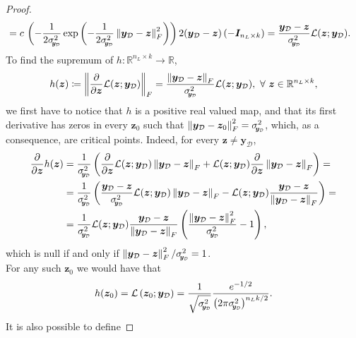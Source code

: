 \documentclass[a4paper, 11pt, reqno]{amsart}
\theoremstyle{plain}
\theoremstyle{remark}
\theoremstyle{definition}
\newcommand{\real}{\mathbb{R}}
\newcommand{\norm}[1]{\left\lVert#1\right\rVert}
\renewcommand{\exp}[1]{\operatorname{exp}\left(#1\right)}
\let\oldforall\forall
\renewcommand{\forall}{\oldforall\,}
\newcommand{\sigmay}{\sigma_{\scalebox{0.65}{$\kern-3pt\bm{y}_{\mathcal{D}}$}}}%
\begin{document}
\begin{proof}
\begin{equation*}
\begin{aligned}
			& = c \, \left(- \frac{1}{2 \sigmay^2} \exp{-\frac{1}{2\sigmay^2} \norm{\bm{y}_{\mathcal{D}} - \bm{z}}_F^2}\right) 2 (\bm{y}_{\mathcal{D}} - \bm{z}) \left(- \bm{I}_{n_L \times k}\right) = \frac{\bm{y}_{\mathcal{D}} - \bm{z}}{\sigmay^2} \mathcal{L}(\bm{z}; \bm{y}_{\mathcal{D}}).
		\end{aligned}
	\end{equation*}
	To find the supremum of $h: \real^{n_L \times k} \to \real$, 
	\begin{equation*}
		h(\bm{z}) \coloneqq \norm{\frac{\partial}{\partial \bm{z}} \mathcal{L}(\bm{z}; \bm{y}_{\mathcal{D}})}_F = \frac{\norm{\bm{y}_{\mathcal{D}} - \bm{z}}_F}{\sigmay^2} \mathcal{L}(\bm{z}; \bm{y}_{\mathcal{D}}), \ \forall \bm{z} \in \real^{n_L \times k},
	\end{equation*}
	we first have to notice that $h$ is a positive real valued map, and that its first derivative has zeros in every $\bm{z}_0$ such that $\norm{\bm{y}_{\mathcal{D}} - \bm{z}_0}_F^2 = \sigmay^2$, which, as a consequence, are critical points. Indeed, for every $\bm{z} \neq \bm{y}_{\mathcal{D}}$,
	\begin{align*}
		\frac{\partial}{\partial \bm{z}} h(\bm{z}) & = \frac{1}{\sigmay^2} \left(\frac{\partial}{\partial \bm{z}} \mathcal{L}(\bm{z}; \bm{y}_{\mathcal{D}}) \norm{\bm{y}_{\mathcal{D}} - \bm{z}}_F + \mathcal{L}(\bm{z}; \bm{y}_{\mathcal{D}}) \frac{\partial}{\partial \bm{z}} \norm{\bm{y}_{\mathcal{D}} - \bm{z}}_F\right) = \\
		& = \frac{1}{\sigmay^2} \left(\frac{\bm{y}_{\mathcal{D}} - \bm{z}}{\sigmay^2} \mathcal{L}(\bm{z}; \bm{y}_{\mathcal{D}}) \norm{\bm{y}_{\mathcal{D}} - \bm{z}}_F - \mathcal{L}(\bm{z}; \bm{y}_{\mathcal{D}}) \frac{\bm{y}_{\mathcal{D}} - \bm{z}}{\norm{\bm{y}_{\mathcal{D}} - \bm{z}}_F}\right) = \\
		& = \frac{1}{\sigmay^2} \mathcal{L}(\bm{z}; \bm{y}_{\mathcal{D}}) \frac{\bm{y}_{\mathcal{D}} - \bm{z}}{\norm{\bm{y}_{\mathcal{D}} - \bm{z}}_F} \left(\frac{\norm{\bm{y}_{\mathcal{D}} - \bm{z}}_F^2}{\sigmay^2} - 1\right),
	\end{align*}
	which is null if and only if $\norm{\bm{y}_{\mathcal{D}} - \bm{z}}_F^2 / \sigmay^2 = 1$. \\
	For any such $\bm{z}_0$ we would have that
	\begin{equation*}
		h(\bm{z}_0) = \mathcal{L}\left(\bm{z}_0; \bm{y}_{\mathcal{D}}\right) = \frac{1}{\sqrt{\sigmay^2}} \frac{e^{-1/2}}{\left(2 \pi \sigmay^2\right)^{n_L k / 2}}.
	\end{equation*}
	It is also possible to define 

\end{proof}
\end{document}

